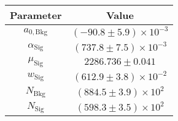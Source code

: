 \begin{tabular}{cc}
  \toprule
  Parameter & Value \\
  \midrule
$a_{0,\mathrm{Bkg}}$ & $(-90.8 \pm 5.9) \times 10^{-3}$ \\
$\alpha_{\mathrm{Sig}}$ & $(737.8 \pm 7.5) \times 10^{-3}$ \\
$\mu_{\mathrm{Sig}}$ & $2286.736 \pm 0.041$ \\
$w_{\mathrm{Sig}}$ & $(612.9 \pm 3.8) \times 10^{-2}$ \\
$N_{\mathrm{Bkg}}$ & $(884.5 \pm 3.9) \times 10^{2}$ \\
$N_{\mathrm{Sig}}$ & $(598.3 \pm 3.5) \times 10^{2}$ \\
  \bottomrule
\end{tabular}